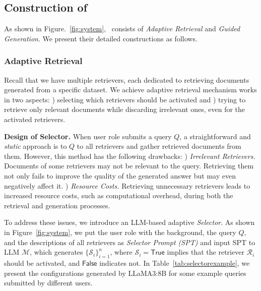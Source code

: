 \subsection{Construction of \iotrgen}\label{sec:retrieval}

%

As shown in Figure.~\ref{fig:system}, \iotrgen\ consists of \textit{Adaptive Retrieval} and \textit{Guided Generation}.
We present their detailed constructions as follows.

\subsubsection{Adaptive Retrieval}\label{sec:rca}
Recall that we have multiple retrievers, each dedicated to retrieving documents generated from a specific dataset. We achieve adaptive retrieval mechanism works in two aspects: 
) selecting which retrievers should be activated and ) trying to retrieve only relevant documents while discarding irrelevant ones, even for the activated retrievers.

\smallskip
\noindent \textbf{Design of Selector.}
When user \textsf{role} submits a query $Q$, a straightforward and \textit{static} approach is to $Q$ to all retrievers and gather retrieved documents from them. 
However, this method has the following drawbacks:
) \textit{Irrelevant Retrievers.} Documents of some retrievers may not be relevant to the query. Retrieving them not only fails to improve the quality of the generated answer but may even negatively affect it.
) \textit{Resource Costs.} Retrieving unnecessary retrievers leads to increased resource costs, such as computational overhead, during both the retrieval and generation processes.

To address these issues, we introduce an LLM-based adaptive \textit{Selector}. As shown in Figure~\ref{fig:system}, we put the user \textsf{role} with the background, the query $Q$, and the descriptions of all retrievers as \textit{Selector Prompt (SPT)} and input SPT to LLM $\mathcal{M}$, which generates $\{\mathcal{S}_i\}_{i=1}^n$,
where $\mathcal{S}_i = \mathsf{True}$ implies that the retriever $\mathcal{R}_i$ should be activated, and $\mathsf{False}$ indicates not. 
In Table~\ref{tab:selectorexample}, we present the configurations generated by LLaMA3:8B for some example queries submitted by different users.

